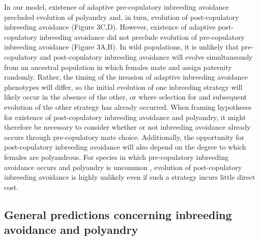 \documentclass[12pt]{article}
\begin{document}
In our model, existence of adaptive pre-copulatory inbreeding avoidance precluded evolution of polyandry and, in turn, evolution of post-copulatory inbreeding avoidance (Figure 3C,D). However, existence of adaptive post-copulatory inbreeding avoidance did not preclude evolution of pre-copulatory inbreeding avoidance (Figure 3A,B). In wild populations, it is unlikely that pre-copulatory and post-copulatory inbreeding avoidance will evolve simultaneously from an ancestral population in which females mate and assign paternity randomly. Rather, the timing of the invasion of adaptive inbreeding avoidance phenotypes will differ, so the initial evolution of one inbreeding strategy will likely occur in the absence of the other, or where selection for and subsequent evolution of the other strategy has already occurred. When framing hypotheses for existence of post-copulatory inbreeding avoidance and polyandry, it might therefore be necessary to consider whether or not inbreeding avoidance already occurs through pre-copulatory mate choice. Additionally, the opportunity for post-copulatory inbreeding avoidance will also depend on the degree to which females are polyandrous. For species in which pre-copulatory inbreeding avoidance occurs and polyandry is uncommon \cite[][]{Lihoreau2007, Metzger2010, Metzger2010a}, evolution of post-copulatory inbreeding avoidance is highly unlikely even if such a strategy incurs little direct cost. 


\subsection*{General predictions concerning inbreeding avoidance and polyandry}
\end{document}
